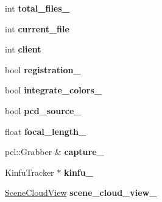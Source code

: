 \begin{DoxyCompactItemize}
\item 
\hypertarget{struct_kin_fu_l_s_app_aca5edae888ae830f27a3313a5bdb47c8}{int {\bfseries total\+\_\+files\+\_\+}}\label{struct_kin_fu_l_s_app_aca5edae888ae830f27a3313a5bdb47c8}

\item 
\hypertarget{struct_kin_fu_l_s_app_ad5ccfa059d15469a0d31de819db76808}{int {\bfseries current\+\_\+file}}\label{struct_kin_fu_l_s_app_ad5ccfa059d15469a0d31de819db76808}

\item 
\hypertarget{struct_kin_fu_l_s_app_ad1df9eccb3a3299f6566612ef1597664}{int {\bfseries client}}\label{struct_kin_fu_l_s_app_ad1df9eccb3a3299f6566612ef1597664}

\item 
\hypertarget{struct_kin_fu_l_s_app_a8b0673281ed574962e3a1b6c5eb58cc4}{bool {\bfseries registration\+\_\+}}\label{struct_kin_fu_l_s_app_a8b0673281ed574962e3a1b6c5eb58cc4}

\item 
\hypertarget{struct_kin_fu_l_s_app_aa6574f198ee47082a329a558001424ba}{bool {\bfseries integrate\+\_\+colors\+\_\+}}\label{struct_kin_fu_l_s_app_aa6574f198ee47082a329a558001424ba}

\item 
\hypertarget{struct_kin_fu_l_s_app_afe09648059b3ab2c3316bf551016cb1e}{bool {\bfseries pcd\+\_\+source\+\_\+}}\label{struct_kin_fu_l_s_app_afe09648059b3ab2c3316bf551016cb1e}

\item 
\hypertarget{struct_kin_fu_l_s_app_a690e662ddd208bd6af2518afcc6d3964}{float {\bfseries focal\+\_\+length\+\_\+}}\label{struct_kin_fu_l_s_app_a690e662ddd208bd6af2518afcc6d3964}

\item 
\hypertarget{struct_kin_fu_l_s_app_a3c6165d4b78a7f150a3574e5378a19eb}{pcl\+::\+Grabber \& {\bfseries capture\+\_\+}}\label{struct_kin_fu_l_s_app_a3c6165d4b78a7f150a3574e5378a19eb}

\item 
\hypertarget{struct_kin_fu_l_s_app_a1e5eb5ce36cf1f4db0a75b2d306cd8a2}{Kinfu\+Tracker $\ast$ {\bfseries kinfu\+\_\+}}\label{struct_kin_fu_l_s_app_a1e5eb5ce36cf1f4db0a75b2d306cd8a2}

\item 
\hypertarget{struct_kin_fu_l_s_app_a5484e646b6be4441a2a094b42fff8e2d}{\hyperlink{struct_scene_cloud_view}{Scene\+Cloud\+View} {\bfseries scene\+\_\+cloud\+\_\+view\+\_\+}}\label{struct_kin_fu_l_s_app_a5484e646b6be4441a2a094b42fff8e2d}


\end{DoxyCompactItemize}
